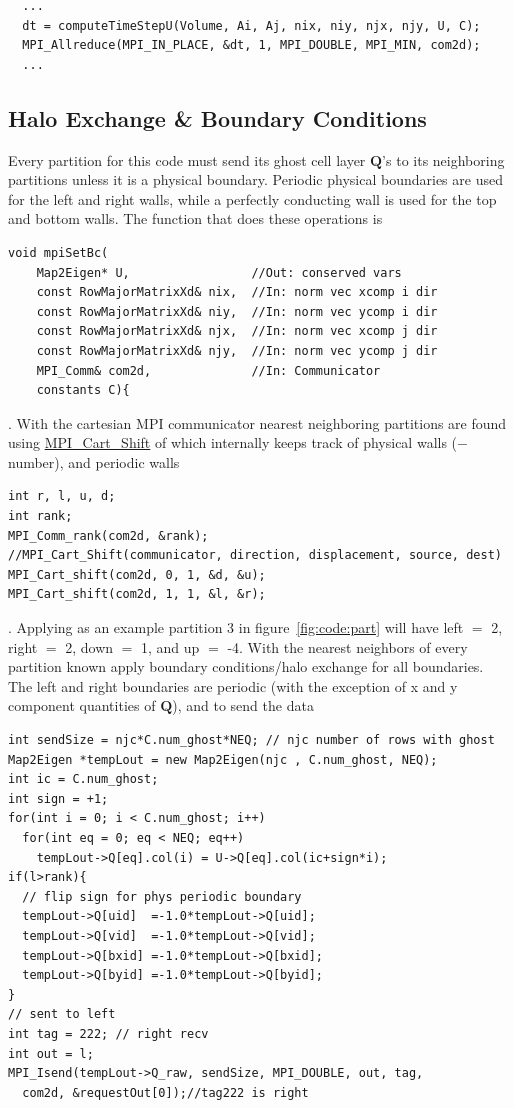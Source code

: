 \documentclass[paper=a4, fontsize=11pt]{scrartcl}
\numberwithin{equation}{section}                %
\numberwithin{figure}{section}                  %
\numberwithin{table}{section}                           %
\begin{document}
\begin{verbatim}
  ...
  dt = computeTimeStepU(Volume, Ai, Aj, nix, niy, njx, njy, U, C);
  MPI_Allreduce(MPI_IN_PLACE, &dt, 1, MPI_DOUBLE, MPI_MIN, com2d);
  ...
\end{verbatim} 

\subsection{Halo Exchange \& Boundary Conditions}
Every partition for this code must send its ghost cell layer $\mathbf{Q}$'s to its neighboring partitions unless it is a physical boundary. Periodic physical boundaries are used for the left and right walls, while a perfectly conducting wall is used for the top and bottom walls. The function that does these operations is
\begin{verbatim}
void mpiSetBc(
    Map2Eigen* U,                 //Out: conserved vars
    const RowMajorMatrixXd& nix,  //In: norm vec xcomp i dir
    const RowMajorMatrixXd& niy,  //In: norm vec ycomp i dir
    const RowMajorMatrixXd& njx,  //In: norm vec xcomp j dir
    const RowMajorMatrixXd& njy,  //In: norm vec ycomp j dir
    MPI_Comm& com2d,              //In: Communicator 
    constants C){
\end{verbatim}
. With the cartesian MPI communicator nearest neighboring partitions are found using \href{https://www.mpich.org/static/docs/v3.2/www3/MPI_Cart_shift.html}{MPI\_Cart\_Shift} of which internally keeps track of physical walls ($-$ number), and periodic walls
\begin{verbatim}
int r, l, u, d;
int rank;
MPI_Comm_rank(com2d, &rank);
//MPI_Cart_Shift(communicator, direction, displacement, source, dest)
MPI_Cart_shift(com2d, 0, 1, &d, &u); 
MPI_Cart_shift(com2d, 1, 1, &l, &r);
\end{verbatim}
. Applying as an example partition 3 in figure~\ref{fig:code:part} will have left $=$ 2, right $=$ 2, down $=$ 1, and up $=$ -4. With the nearest neighbors of every partition known apply boundary conditions/halo exchange for all boundaries. The left and right boundaries are periodic (with the exception of x and y component quantities of $\mathbf{Q}$), and to send the data 
\begin{verbatim}
int sendSize = njc*C.num_ghost*NEQ; // njc number of rows with ghost
Map2Eigen *tempLout = new Map2Eigen(njc , C.num_ghost, NEQ);
int ic = C.num_ghost;
int sign = +1;
for(int i = 0; i < C.num_ghost; i++)
  for(int eq = 0; eq < NEQ; eq++)
    tempLout->Q[eq].col(i) = U->Q[eq].col(ic+sign*i);
if(l>rank){
  // flip sign for phys periodic boundary
  tempLout->Q[uid]  =-1.0*tempLout->Q[uid];
  tempLout->Q[vid]  =-1.0*tempLout->Q[vid];
  tempLout->Q[bxid] =-1.0*tempLout->Q[bxid];
  tempLout->Q[byid] =-1.0*tempLout->Q[byid];
}
// sent to left 
int tag = 222; // right recv
int out = l;
MPI_Isend(tempLout->Q_raw, sendSize, MPI_DOUBLE, out, tag, 
  com2d, &requestOut[0]);//tag222 is right
\end{verbatim}
\end{document}
